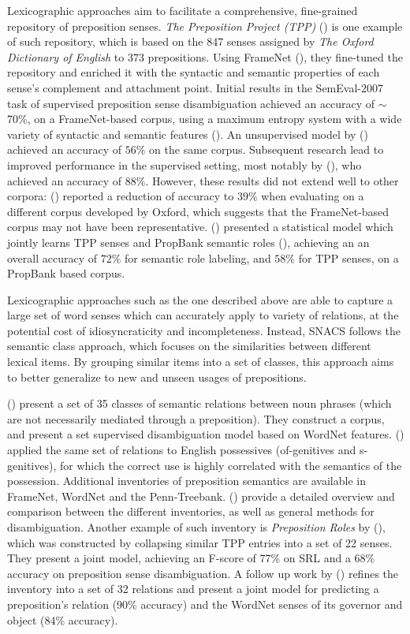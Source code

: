 Lexicographic approaches aim to facilitate a comprehensive, fine-grained repository of preposition senses. \textit{The Preposition Project (TPP)} (\cite{litkowski-05}) is one example of such repository, which is based on the 847 senses assigned by \textit{The Oxford Dictionary of English} to 373 prepositions. Using FrameNet (\cite{baker-98}), they fine-tuned the repository and enriched it with the syntactic and semantic properties of each sense's complement and attachment point. Initial results in the SemEval-2007 task of supervised preposition sense disambiguation achieved an accuracy of $\sim$70\%, on a FrameNet-based corpus, using a maximum entropy system with a wide variety of syntactic and semantic
features (\cite{ye2007melb}). An unsupervised model by (\cite{hovy-11}) achieved an accuracy of $56\%$ on the same corpus. Subsequent research lead to improved performance in the supervised setting, most notably by (\cite{tratz2011semantically}), who achieved an accuracy of $88\%$. 
However, these results did not extend well to other corpora: (\cite{litkowski2013preposition}) reported a reduction of accuracy to $39\%$ when evaluating on a different corpus developed by Oxford, which suggests that the FrameNet-based corpus may not have been representative. (\cite{dahlmeier-09}) presented a statistical model which jointly learns TPP senses and PropBank semantic roles (\cite{kingsbury2002treebank}), achieving an an overall accuracy of $72\%$ for semantic role labeling, and $58\%$ for TPP senses, on a PropBank based corpus.

Lexicographic approaches such as the one described above are able to capture a large set of word senses which can accurately apply to variety of relations, at the potential cost of idiosyncraticity and incompleteness. Instead, SNACS follows the semantic class approach, which focuses on the similarities between different lexical items. By grouping similar items into a set of classes, this approach aims to better generalize to new and unseen usages of prepositions.

(\cite{moldovan-04}) present a set of 35 classes of semantic relations between noun phrases (which are not necessarily mediated through a preposition). They construct a corpus, and present a set supervised disambiguation model based on WordNet features. (\cite{badulescu-09}) applied the same set of relations to English possessives (of-genitives and s-genitives), for which the correct use is highly correlated with the semantics of the possession. Additional inventories of preposition semantics are available in FrameNet, WordNet and the Penn-Treebank. (\cite{ohara-09}) provide a detailed overview and comparison between the different inventories, as well as general methods for disambiguation. Another example of such inventory is \textit{Preposition Roles} by (\cite{srikumar-11}), which was constructed by collapsing similar TPP entries into a set of 22 senses. They present a joint model, achieving an F-score of 77\% on SRL and a 68\% accuracy on preposition sense disambiguation. A follow up work by (\cite{srikumar-13}) refines the inventory into a set of 32 relations and present a joint model for predicting a preposition's relation (90\% accuracy) and the WordNet senses of its governor and object (84\% accuracy). 

